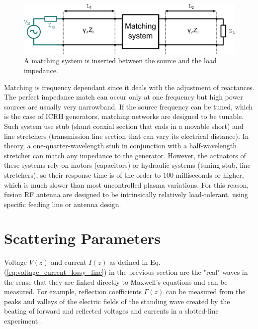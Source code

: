 \begin{figure}
	\includegraphics[width=1\linewidth]{figures/chap3/transmission_line_matching_system}
	\caption{A matching system is inserted between the source and the load impedance.}
	\label{fig:transmission_matching_system}
\end{figure}

Matching is frequency dependant since it deals with the adjustment of reactances. The perfect impedance match can occur only at one frequency but high power sources are usually very narrowband. If the source frequency can be tuned, which is the case of ICRH generators, matching networks are designed to be tunable. Such system use stub (shunt coaxial section that ends in a movable short) and line stretchers (transmission line section that can vary its electrical distance). In theory, a one-quarter-wavelength stub in conjunction with a half-wavelength stretcher can match any impedance to the generator. However, the actuators of these systems rely on motors (capacitors) or hydraulic systems (tuning stub, line stretchers), so their response time is of the order to 100 milliseconds or higher, which is much slower than most uncontrolled plasma variations. For this reason, fusion RF antenna are designed to be intrinsically relatively load-tolerant, using specific feeding line or antenna design. 


\section{Scattering Parameters}\label{sec:s-parameters}
Voltage  $V(z)$ and current $I(z)$ as defined in Eq.(\ref{eq:voltage_current_lossy_line}) in the previous section are the "real" waves in the sense that they are linked directly to Maxwell’s equations and can be measured. For example, reflection coefficients $\Gamma(z)$ can be measured from the peaks and valleys of the electric fields of the standing wave created by the beating of forward and reflected voltages and currents in a slotted-line experiment . 

